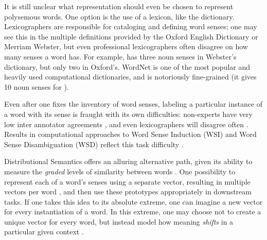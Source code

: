 It is still unclear what representation should even be chosen
to represent polysemous words. One option is the use of a lexicon, like the
dictionary.  Lexicographers are responsible for cataloging and defining word
senses; one may see this in the multiple definitions provided by the Oxford
English Dictionary or Merriam Webster, but even professional lexicographers
often disagree on how many senses a word has. For example,  has
three noun senses in Webster's dictionary, but only two in Oxford's.
WordNet \cite{miller:1995:acm} is one of the most popular and heavily used
computational dictionaries, and is notoriously fine-grained (it gives 10
noun senses for ).

Even after one fixes the inventory of word senses, labeling a particular
instance of a word with its sense is fraught with its own difficulties:
non-experts have very low inter annotator agreements \cite{yong:1999:siglex},
and even lexicographers will disagree often \cite{kilgarriff:2000:ch}.
Results in computational approaches to Word Sense Induction (WSI) and Word
Sense Disambiguation (WSD) reflect this task difficulty \cite{mccarthy:2009:llc,navigli:2009:csur}.

Distributional Semantics offers an alluring alternative path, given its ability
to measure the {\em graded} levels of similarity between words
\cite{erk:2008:emnlp}.  One possibility to represent each of a word's senses
using a separate vector, resulting in multiple vectors per word
\cite{reisinger:2010:naacl,huang:2012:acl}, and then use
these prototypes appropriately in downstream tasks. If one takes this idea to
its absolute extreme, one can imagine a new vector for every instantiation of a
word. In this extreme, one may choose not to create a unique vector for every
word, but instead model how meaning {\em shifts} in a particular given context
\cite{erk:2008:emnlp,erk:2010:gems}.

